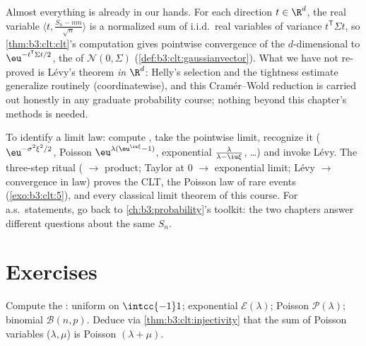 \begin{remark}\label{rem:b3:clt:multiclt}
Almost everything is already in our hands. For each
direction $t \in \R^d$, the real variable $\langle t,
\frac{S_n - nm}{\sqrt n}\rangle$ is a normalized sum of
i.i.d.\ real variables of variance $t^{\mathsf T}\Sigma t$,
so \cref{thm:b3:clt:clt}'s computation gives pointwise
convergence of the $d$-dimensional 
to $\eu^{-t^{\mathsf T}\Sigma t/2}$, the  of $\mathcal N(0, \Sigma)$
(\cref{def:b3:clt:gaussianvector}). What we have not
re-proved is L\'evy's  theorem \emph{in $\R^d$}:
Helly's selection and the tightness estimate generalize
routinely (coordinatewise), and this Cram\'er--Wold
reduction is carried out honestly in any graduate
probability course; nothing beyond this chapter's methods is
needed.
\end{remark}

\begin{method}\label{met:b3:clt:method}
To identify a limit law: compute ,
take the pointwise limit, recognize it (
$\eu^{-\sigma^2\xi^2/2}$, Poisson
$\eu^{\lambda(\eu^{\iu\xi}-1)}$, exponential $\frac{\lambda}
{\lambda - \iu\xi}$, \dots) and invoke L\'evy. The three-step
ritual ( $\to$ product; Taylor at $0$ $\to$
exponential limit; L\'evy $\to$ convergence in law) proves
the CLT, the Poisson law of rare events
(\cref{exo:b3:clt:5}), and every classical limit theorem of
this course. For a.s.\ statements, go back to
\cref{ch:b3:probability}'s toolkit: the two chapters answer
different questions about the same $S_n$.
\end{method}

\section{Exercises}

\begin{exercise}[$\star$]\label{exo:b3:clt:1}
Compute the : uniform on
$\intcc{-1}1$; exponential $\mathcal E(\lambda)$; Poisson
$\mathcal P(\lambda)$; binomial $\mathcal B(n, p)$. Deduce
via \cref{thm:b3:clt:injectivity} that the sum of 
Poisson variables ($\lambda, \mu$) is Poisson $(\lambda +
\mu)$.
\end{exercise}

